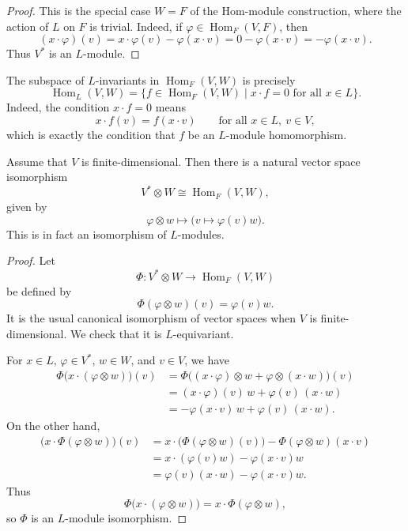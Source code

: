 \begin{proof}
    This is the special case \(W=F\) of the Hom-module construction, where the action of
    \(L\) on \(F\) is trivial. Indeed, if \(\varphi\in \operatorname{Hom}_F(V,F)\), then
    \[
        (x\cdot \varphi)(v)=x\cdot \varphi(v)-\varphi(x\cdot v)=0-\varphi(x\cdot v)
        =-\varphi(x\cdot v).
    \]
    Thus \(V^*\) is an \(L\)-module.
\end{proof}

\begin{remark}
    The subspace of \(L\)-invariants in \(\operatorname{Hom}_F(V,W)\) is precisely
    \[
        \operatorname{Hom}_L(V,W)
        =
        \{f\in \operatorname{Hom}_F(V,W)\mid x\cdot f=0 \text{ for all } x\in L\}.
    \]
    Indeed, the condition \(x\cdot f=0\) means
    \[
        x\cdot f(v)=f(x\cdot v)
        \qquad \text{for all } x\in L,\ v\in V,
    \]
    which is exactly the condition that \(f\) be an \(L\)-module homomorphism.
\end{remark}

\begin{proposition}
    Assume that \(V\) is finite-dimensional. Then there is a natural vector space isomorphism
    \[
        V^*\otimes W \cong \operatorname{Hom}_F(V,W),
    \]
    given by
    \[
        \varphi\otimes w \longmapsto \bigl(v\mapsto \varphi(v)w\bigr).
    \]
    This is in fact an isomorphism of \(L\)-modules.
\end{proposition}

\begin{proof}
    Let
    \[
        \Phi:V^*\otimes W \to \operatorname{Hom}_F(V,W)
    \]
    be defined by
    \[
        \Phi(\varphi\otimes w)(v)=\varphi(v)w.
    \]
    It is the usual canonical isomorphism of vector spaces when \(V\) is finite-dimensional.
    We check that it is \(L\)-equivariant.

    For \(x\in L\), \(\varphi\in V^*\), \(w\in W\), and \(v\in V\), we have
    \begin{align*}
        \Phi\bigl(x\cdot (\varphi\otimes w)\bigr)(v)
         & =\Phi\bigl((x\cdot \varphi)\otimes w+\varphi\otimes (x\cdot w)\bigr)(v) \\
         & =(x\cdot \varphi)(v)\,w+\varphi(v)\,(x\cdot w)                          \\
         & =-\varphi(x\cdot v)\,w+\varphi(v)\,(x\cdot w).
    \end{align*}
    On the other hand,
    \begin{align*}
        \bigl(x\cdot \Phi(\varphi\otimes w)\bigr)(v)
         & =x\cdot \bigl(\Phi(\varphi\otimes w)(v)\bigr)-\Phi(\varphi\otimes w)(x\cdot v) \\
         & =x\cdot (\varphi(v)w)-\varphi(x\cdot v)w                                       \\
         & =\varphi(v)(x\cdot w)-\varphi(x\cdot v)w.
    \end{align*}
    Thus
    \[
        \Phi\bigl(x\cdot (\varphi\otimes w)\bigr)=x\cdot \Phi(\varphi\otimes w),
    \]
    so \(\Phi\) is an \(L\)-module isomorphism.
\end{proof}

